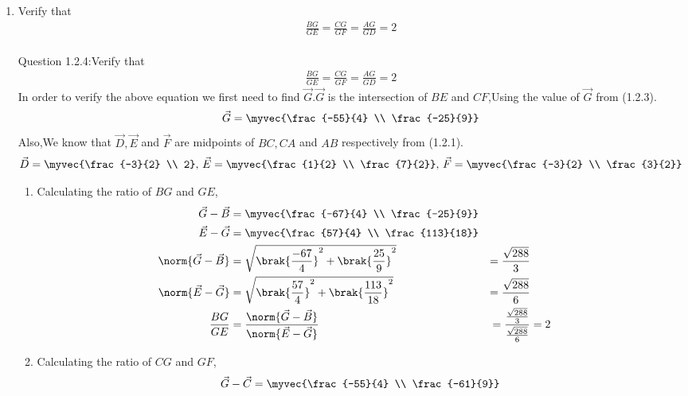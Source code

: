 \documentclass[11pt]{book}
\begin{document}
\begin{enumerate}[label=\thesection.\arabic*.,ref=\thesection.\theenumi]
\item Verify that 
		\begin{align}
			\frac{BG}{GE} = 
			\frac{CG}{GF} =
			\frac{AG}{GD} =2 
		\end{align}\\
Question 1.2.4:Verify that 
\begin{align}
		\frac{BG}{GE} = 
		\frac{CG}{GF} =
		\frac{AG}{GD} = 2 
\end{align}
\solution In order to verify the above equation we first need to find $\vec{G}$.$\vec{G}$ is the intersection of $BE$ and $CF$,Using the value of $\vec{G}$ from (1.2.3).
\begin{align}
		\vec{G} = \myvec{\frac{-55}{4} \\ \frac{-25}{9}}
\end{align}
Also,We know that $\vec{D}, \vec{E}$ and $\vec{F}$ are midpoints of $BC, CA$ and $AB$ respectively from (1.2.1).
\begin{align}
		\vec{D} = \myvec{\frac{-3}{2} \\ 2},\,
		\vec{E} = \myvec{\frac{1}{2} \\ \frac{7}{2}},\,
		\vec{F} = \myvec{\frac{-3}{2} \\ \frac{3}{2}}
\end{align}
\begin{enumerate}
\item Calculating the ratio of $BG$ and $GE$,
\begin{align}
		\label{eq:tri-pts/4} \vec{G}-\vec{B} &= \myvec{\frac{-67}{4} \\ \frac{-25}{9}} \\
		\label{eq:tri-pts/5} \vec{E}-\vec{G} &= \myvec{\frac{57}{4} \\ \frac{113}{18}} \\
		\label{eq:tri-pts/6} \norm{\vec{G}-\vec{B}} &= \sqrt{\brak{\frac{-67}{4}}^2 + \brak{\frac{25}{9}}^{2}} &= \frac{\sqrt{288}}{3} \\
		\label{eq:tri-pts/7} \norm{\vec{E}-\vec{G}} &= \sqrt{\brak{\frac{57}{4}}^2 + \brak{\frac{113}{18}}^2} &= \frac{\sqrt{288}}{6} \\
		\label{eq:tri-pts/8}\frac{BG}{GE} &= \frac{\norm{\vec{G}-\vec{B}}}{\norm{\vec{E}-\vec{G}}} &= \frac{\frac{\sqrt{288}}{3}}{\frac{\sqrt{288}}{6}} &= 2  
\end{align}		
\item Calculating the ratio of $CG$ and $GF$,
\begin{align}
		\label{eq:tri-pts/9} \vec{G}-\vec{C} &= \myvec{\frac{-55}{4} \\ \frac{-61}{9}} \\

\end{align}
\end{enumerate}
\end{enumerate}
\end{document}
